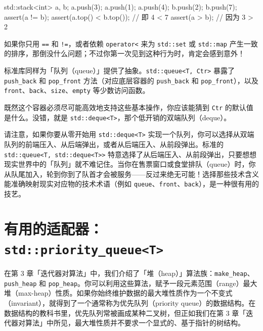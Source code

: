 \begin{codebox}[cpp]
    std::stack<int> a, b;
    a.push(3); a.push(1); a.push(4);
    b.push(2); b.push(7);
    assert(a != b);
    assert(a.top() < b.top()); // 即 4 < 7
    assert(a > b); // 因为 3 > 2
\end{codebox}

如果你只用 \texttt{==} 和 \texttt{!=}，或者依赖 \texttt{operator<} 来为 \texttt{std::\allowbreak{}set} 或 \texttt{std::\allowbreak{}map} 产生一致的排序，那倒没什么问题；不过你第一次见到这种行为时，肯定会感到意外！

标准库同样为「队列（queue）」提供了抽象。\texttt{std::\allowbreak{}queue<\allowbreak{}T,\allowbreak{} Ctr>\allowbreak{}} 暴露了 \texttt{push\_\allowbreak{}back} 和 \texttt{pop\_\allowbreak{}front} 方法（对应底层容器的 \texttt{push\_\allowbreak{}back} 和 \texttt{pop\_\allowbreak{}front}），以及 \texttt{front}、\texttt{back}、\texttt{size}、\texttt{empty} 等少数访问函数。

既然这个容器必须尽可能高效地支持这些基本操作，你应该能猜到 \texttt{Ctr} 的默认值是什么。没错，就是 \texttt{std::\allowbreak{}deque<\allowbreak{}T>\allowbreak{}}，那个低开销的双端队列（deque）。

请注意，如果你要从零开始用 \texttt{std::\allowbreak{}deque<\allowbreak{}T>\allowbreak{}} 实现一个队列，你可以选择从双端队列的前端压入、从后端弹出，或者从后端压入、从前段弹出。标准的 \texttt{std::\allowbreak{}queue<\allowbreak{}T,\allowbreak{} std::\allowbreak{}deque<\allowbreak{}T>\allowbreak{}>} 特意选择了从后端压入、从前段弹出，只要想想现实世界中的「队列」就不难记住。当你在售票窗口或食堂排队（queue）时，你从队尾加入，轮到你到了队首才会被服务——反过来绝无可能！选择那些技术含义能准确映射现实对应物的技术术语（例如 \texttt{queue}、\texttt{front}、\texttt{back}），是一种很有用的技艺。

\section{有用的适配器：\texttt{std::\allowbreak{}priority\_\allowbreak{}queue<\allowbreak{}T>\allowbreak{}}}

在第 3 章「迭代器对算法」中，我们介绍了「堆（heap）」算法族：\texttt{make\_\allowbreak{}heap}、\texttt{push\_\allowbreak{}heap} 和 \texttt{pop\_\allowbreak{}heap}。你可以利用这些算法，赋予一段元素范围（range）最大堆（max-heap）性质。如果你始终维护数据的最大堆性质作为一个不变式（invariant），就得到了一个通常称为优先队列（priority queue）的数据结构。在数据结构的教科书里，优先队列常被画成某种二叉树，但正如我们在第 3 章「迭代器对算法」中所见，最大堆性质并不要求一个显式的、基于指针的树结构。

